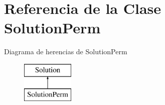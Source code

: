 \hypertarget{class_solution_perm}{\section{Referencia de la Clase Solution\+Perm}
\label{class_solution_perm}
}
Diagrama de herencias de Solution\+Perm\begin{figure}[H]
\begin{center}
\leavevmode
\includegraphics[height=2.000000cm]{class_solution_perm}
\end{center}
\end{figure}

